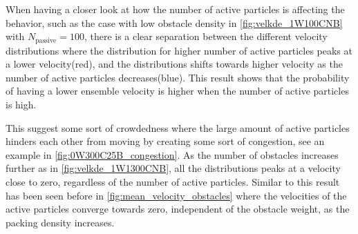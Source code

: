When having a closer look at how the number of active particles is affecting the behavior, such as the case with 
low obstacle density in \cref{fig:velkde_1W100CNB} with $N_{\text{passive}}=100$, there is a clear separation 
between the different velocity distributions where the distribution for higher number of active particles peaks 
at a lower velocity(red), and the distributions shifts towards higher velocity as the number of active particles decreases(blue).
This result shows that the probability of having a lower ensemble velocity is higher when the number of active particles 
is high.




This suggest some sort of crowdedness where the large amount of active particles hinders each 
other from moving by creating some sort of congestion, see an example in \cref{fig:0W300C25B_congestion}. 
As the number of obstacles increases further as in \cref{fig:velkde_1W1300CNB}, 
all the distributions peaks at a velocity close to zero, regardless of the number of active particles. Similar to this result 
has been seen before in \cref{fig:mean_velocity_obstacles} where the velocities of the active particles converge towards zero, 
independent of the obstacle weight, as the packing density increases.    


